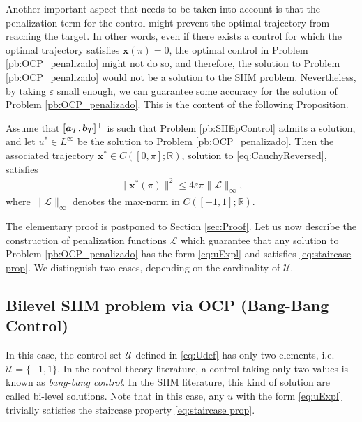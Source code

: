 \documentclass[twocolumn]{autart}    %
\begin{document}
Another important aspect that needs to be taken into account is that the penalization term for the control might prevent the optimal trajectory from reaching the target. In other words, even if there exists a control for which the optimal trajectory satisfies $\bm{x} (\pi) = 0$, the optimal control in Problem \ref{pb:OCP_penalizado} might not do so, and therefore, the solution to Problem \ref{pb:OCP_penalizado} would not be a solution to the SHM problem. Nevertheless, by taking $\varepsilon$ small enough, we can guarantee some accuracy for the solution of Problem \ref{pb:OCP_penalizado}. This is the content of the following Proposition.

\bigskip

\begin{proposition}\label{Prop:approx controllability}
Assume that $[\bm{a}_T,\bm{b}_T]^\top$ is such that Problem \ref{pb:SHEpControl} admits a solution, and let $u^\ast\in L^\infty$ be the solution to Problem \ref{pb:OCP_penalizado}. Then the associated trajectory $\bm{x}^\ast\in C([0,\pi];\mathbb{R})$, solution to \eqref{eq:CauchyReversed}, satisfies
\begin{align*} 
	\| \bm{x}^\ast (\pi)  \|^2 \leq  4 \varepsilon \pi \| \mathcal{L}\|_\infty,
\end{align*}
where $\| \mathcal{L}\|_\infty$ denotes the max-norm in $C([-1,1]; \mathbb{R})$.
\end{proposition}

The elementary proof is postponed to Section \ref{sec:Proof}. Let us now describe the construction of penalization functions $\mathcal{L}$ which guarantee that any solution to Problem \ref{pb:OCP_penalizado} has the form \eqref{eq:uExpl} and satisfies \eqref{eq:staircase prop}. We distinguish two cases, depending on the cardinality of $\mathcal{U}$.

\subsection{Bilevel SHM problem via OCP (Bang-Bang Control)} 

In this case, the control set $\mathcal{U}$ defined in \eqref{eq:Udef} has only two elements, i.e.  $\mathcal{U}=\{-1,1\}$.
In the control theory literature, a control taking only two values is known as \emph{bang-bang control}. In the SHM literature, this kind of solution are called bi-level solutions. Note that in this case, any $u$ with the form \eqref{eq:uExpl}  trivially satisfies the staircase property \eqref{eq:staircase prop}.
\end{document}
